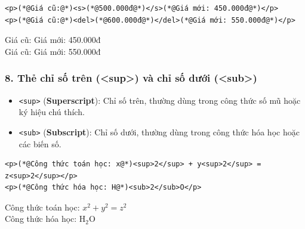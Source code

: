 \documentclass[11pt,oneside]{book}
\newcommand{\codeinline}[1]{\textcolor{accentOrange}{\texttt{#1}}}
\begin{document}
\begin{codeWindow}
\begin{lstlisting}[language=HTML5]
<p>(*@Giá cũ:@*)<s>(*@500.000đ@*)</s>(*@Giá mới: 450.000đ@*)</p>
<p>(*@Giá cũ:@*)<del>(*@600.000đ@*)</del>(*@Giá mới: 550.000đ@*)</p>
\end{lstlisting}
\end{codeWindow}

\begin{tcolorbox}[
    enhanced,
    colback=white,
    colframe=primaryBlue!20,
    arc=6pt,
    boxrule=0.8pt,
    drop shadow=black!3!white,
    top=8pt, bottom=8pt, left=12pt, right=12pt,
    title={\sffamily\bfseries\scriptsize\color{codeComment} KẾT QUẢ HIỂN THỊ TRÊN TRÌNH DUYỆT (BROWSER PREVIEW)},
    coltitle=codeComment,
    colbacktitle=codeBg!80!white
]
Giá cũ:  Giá mới: 450.000đ\\[3pt]
Giá cũ:  Giá mới: 550.000đ
\end{tcolorbox}


\subsubsection{8. Thẻ chỉ số trên (<sup>) và chỉ số dưới (<sub>)}

\begin{itemize}[leftmargin=1.8em, itemsep=3pt, parsep=0pt]
    \item \codeinline{<sup>} (\textbf{Superscript}): Chỉ số trên, thường dùng trong công thức số mũ hoặc ký hiệu chú thích.
    \item \codeinline{<sub>} (\textbf{Subscript}): Chỉ số dưới, thường dùng trong công thức hóa học hoặc các biến số.
\end{itemize}

\begin{codeWindow}
\begin{lstlisting}[language=HTML5]
<p>(*@Công thức toán học: x@*)<sup>2</sup> + y<sup>2</sup> = z<sup>2</sup></p>
<p>(*@Công thức hóa học: H@*)<sub>2</sub>O</p>
\end{lstlisting}
\end{codeWindow}

\begin{tcolorbox}[
    enhanced,
    colback=white,
    colframe=primaryBlue!20,
    arc=6pt,
    boxrule=0.8pt,
    drop shadow=black!3!white,
    top=8pt, bottom=8pt, left=12pt, right=12pt,
    title={\sffamily\bfseries\scriptsize\color{codeComment} KẾT QUẢ HIỂN THỊ TRÊN TRÌNH DUYỆT (BROWSER PREVIEW)},
    coltitle=codeComment,
    colbacktitle=codeBg!80!white
]
Công thức toán học: $x^2 + y^2 = z^2$\\[3pt]
Công thức hóa học: $\text{H}_2\text{O}$
\end{tcolorbox}
\end{document}
